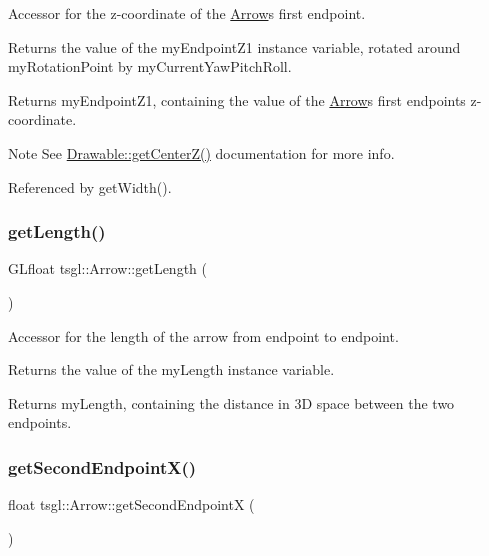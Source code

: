 Accessor for the z-\/coordinate of the \hyperlink{classtsgl_1_1_arrow}{Arrow}\textquotesingle{}s first endpoint. 

Returns the value of the my\+Endpoint\+Z1 instance variable, rotated around my\+Rotation\+Point by my\+Current\+Yaw\+Pitch\+Roll. \begin{DoxyReturn}{Returns}
my\+Endpoint\+Z1, containing the value of the \hyperlink{classtsgl_1_1_arrow}{Arrow}\textquotesingle{}s first endpoint\textquotesingle{}s z-\/coordinate. 
\end{DoxyReturn}
\begin{DoxyNote}{Note}
See \hyperlink{classtsgl_1_1_drawable_a6a6c0441d94ffebd149f88ae3ab87ced}{Drawable\+::get\+Center\+Z()} documentation for more info. 
\end{DoxyNote}


Referenced by get\+Width().

\mbox{\label{classtsgl_1_1_arrow_a26d2e0e5ab4856b1cd998ec5ebccb9bb}} 
\subsubsection{\texorpdfstring{get\+Length()}{getLength()}}
{\footnotesize\ttfamily G\+Lfloat tsgl\+::\+Arrow\+::get\+Length (\begin{DoxyParamCaption}{ }\end{DoxyParamCaption})\hspace{0.3cm}{\ttfamily [inline]}}



Accessor for the length of the arrow from endpoint to endpoint. 

Returns the value of the my\+Length instance variable. \begin{DoxyReturn}{Returns}
my\+Length, containing the distance in 3D space between the two endpoints. 
\end{DoxyReturn}
\mbox{\label{classtsgl_1_1_arrow_aa17e6bfe5f41e5a13a8378b1819f108d}} 
\subsubsection{\texorpdfstring{get\+Second\+Endpoint\+X()}{getSecondEndpointX()}}
{\footnotesize\ttfamily float tsgl\+::\+Arrow\+::get\+Second\+EndpointX (\begin{DoxyParamCaption}{ }\end{DoxyParamCaption})}




